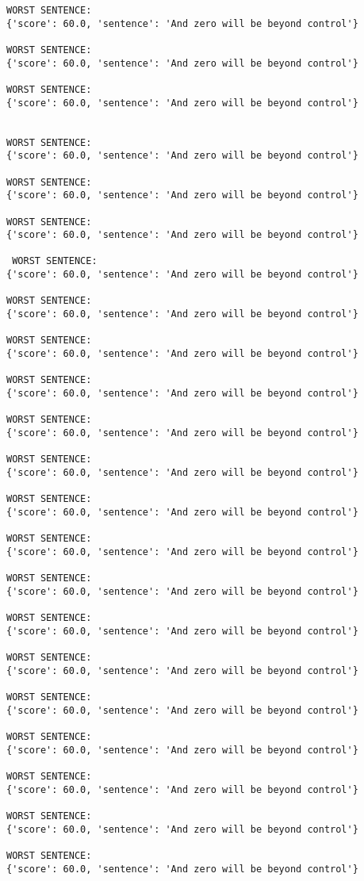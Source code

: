 \documentclass[12pt,a4paper,oneside]{book}
\begin{document}
\begin{verbatim}
WORST SENTENCE:
{'score': 60.0, 'sentence': 'And zero will be beyond control'}

WORST SENTENCE:
{'score': 60.0, 'sentence': 'And zero will be beyond control'}

WORST SENTENCE:
{'score': 60.0, 'sentence': 'And zero will be beyond control'}
 
 
WORST SENTENCE:
{'score': 60.0, 'sentence': 'And zero will be beyond control'}

WORST SENTENCE:
{'score': 60.0, 'sentence': 'And zero will be beyond control'}

WORST SENTENCE:
{'score': 60.0, 'sentence': 'And zero will be beyond control'}

 WORST SENTENCE:
{'score': 60.0, 'sentence': 'And zero will be beyond control'}

WORST SENTENCE:
{'score': 60.0, 'sentence': 'And zero will be beyond control'}

WORST SENTENCE:
{'score': 60.0, 'sentence': 'And zero will be beyond control'}

WORST SENTENCE:
{'score': 60.0, 'sentence': 'And zero will be beyond control'}

WORST SENTENCE:
{'score': 60.0, 'sentence': 'And zero will be beyond control'}

WORST SENTENCE:
{'score': 60.0, 'sentence': 'And zero will be beyond control'}

WORST SENTENCE:
{'score': 60.0, 'sentence': 'And zero will be beyond control'}

WORST SENTENCE:
{'score': 60.0, 'sentence': 'And zero will be beyond control'}

WORST SENTENCE:
{'score': 60.0, 'sentence': 'And zero will be beyond control'}

WORST SENTENCE:
{'score': 60.0, 'sentence': 'And zero will be beyond control'}

WORST SENTENCE:
{'score': 60.0, 'sentence': 'And zero will be beyond control'}

WORST SENTENCE:
{'score': 60.0, 'sentence': 'And zero will be beyond control'}

WORST SENTENCE:
{'score': 60.0, 'sentence': 'And zero will be beyond control'}

WORST SENTENCE:
{'score': 60.0, 'sentence': 'And zero will be beyond control'}

WORST SENTENCE:
{'score': 60.0, 'sentence': 'And zero will be beyond control'}

WORST SENTENCE:
{'score': 60.0, 'sentence': 'And zero will be beyond control'}


\end{verbatim}
\end{document}
